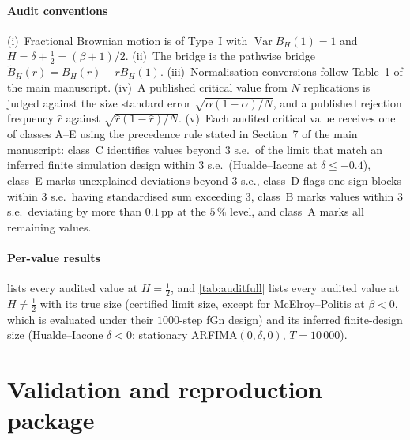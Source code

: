 \documentclass[final,3p,11pt]{elsarticle}
\newcommand{\Bt}{\tilde B_H}
\begin{document}
\begin{table}[!htbp]\centering\small
\caption{Documents, versions and table locations for the published values in the audit.}\label{tab:sources}
%
\end{table}
\FloatBarrier

\paragraph{Audit conventions} (i)~Fractional Brownian motion is of Type~I with $\operatorname{Var}B_H(1)=1$ and $H=\delta+\frac12=(\beta+1)/2$. (ii)~The bridge is the pathwise bridge $\Bt(r)=B_H(r)-rB_H(1)$. (iii)~Normalisation conversions follow Table~1 of the main manuscript. (iv)~A published critical value from $N$ replications is judged against the size standard error $\sqrt{\alpha(1-\alpha)/N}$, and a published rejection frequency $\hat r$ against $\sqrt{\hat r(1-\hat r)/N}$. (v)~Each audited critical value receives one of classes A--E using the precedence rule stated in Section~7 of the main manuscript: class~C identifies values beyond $3$ s.e.\ of the limit that match an inferred finite simulation design within $3$ s.e.\ (Hualde--Iacone at $\delta\le-0.4$), class~E marks unexplained deviations beyond $3$ s.e., class~D flags one-sign blocks within $3$ s.e.\ having standardised sum exceeding $3$, class~B marks values within $3$ s.e.\ deviating by more than $0.1$\,pp at the $5\,\%$ level, and class~A marks all remaining values.

\paragraph{Per-value results}  lists every audited value at $H=\frac12$, and \cref{tab:auditfull} lists every audited value at $H\ne\frac12$ with its true size (certified limit size, except for McElroy--Politis at $\beta<0$, which is evaluated under their $1000$-step fGn design) and its inferred finite-design size (Hualde--Iacone $\delta<0$: stationary ARFIMA$(0,\delta,0)$, $T=10\,000$).

{\footnotesize\setlength{\tabcolsep}{4pt}}%

{\footnotesize\setlength{\tabcolsep}{4pt}}%

\FloatBarrier

\section{Validation and reproduction package}\label{supp:repro}
\end{document}
